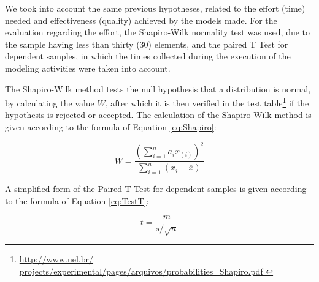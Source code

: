 We took into account the same previous hypotheses, related to the effort (time) needed and effectiveness (quality) achieved by the models made.
For the evaluation regarding the effort, the Shapiro-Wilk normality test was used, due to the sample having less than thirty (30) elements, and the paired T Test for dependent samples, in which the times collected during the execution of the modeling activities were taken into account.

The Shapiro-Wilk method tests the null hypothesis that a distribution is normal, by calculating the value $W$, after which it is then verified in the test table\footnote{\url{ http://www.uel.br/ projects/experimental/pages/arquivos/probabilities\_Shapiro.pdf }} if the hypothesis is rejected or accepted.
The calculation of the Shapiro-Wilk method is given according to the formula of Equation \ref{eq:Shapiro}:

\begin{equation}
\label{eq:Shapiro}
W = \frac{\left(\sum_{i=1}^{n} a_ix_{(i)}\right)^2}{\sum_{i=1}^{n}\left(x_i -\overline{x}\right)} 
\end{equation}

A simplified form of the Paired T-Test for dependent samples
is given according to the formula of Equation \ref{eq:TestT}:

\begin{equation}
\label{eq:TestT}
t = \frac{m}{s/\sqrt{n}} 
\end{equation}

